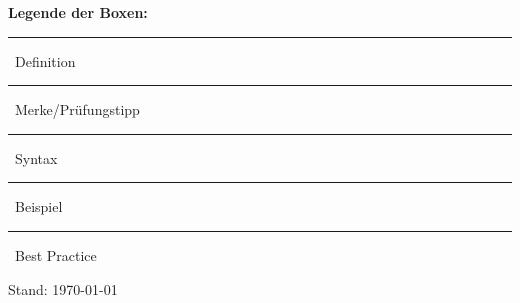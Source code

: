 \documentclass[11pt,a4paper]{scrartcl}
\begin{document}
\begin{titlepage}
\vfill
\begin{tcolorbox}[width=0.9\linewidth,colback=merkeredbg,colframe=merkered,boxrule=0.6pt]
\small\textbf{Legende der Boxen:}\quad
\textcolor{defblue}{\rule{2.5mm}{2.5mm}}~Definition \quad
\textcolor{merkered}{\rule{2.5mm}{2.5mm}}~Merke/Pr\"ufungstipp \quad
\textcolor{syntaxgreen}{\rule{2.5mm}{2.5mm}}~Syntax \quad
\textcolor{beispielorange}{\rule{2.5mm}{2.5mm}}~Beispiel \quad
\textcolor{tippteal}{\rule{2.5mm}{2.5mm}}~Best Practice
\end{tcolorbox}
\vspace{0.5cm}
{\small Stand: \today\par}
\end{titlepage}

\tableofcontents
\newpage













\end{document}
